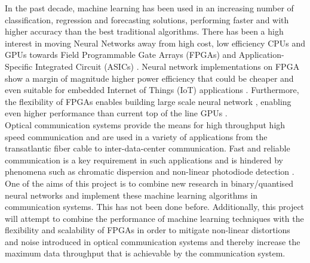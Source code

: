 
\iffalse

Copied and pasted the introduction from our proposal report. I think it's a good start. I've summarised the notes for the intro from the guide below:

- Starting with a general introduction of the area of study and leading to a very narrow insight into the focus of the project
- Aims and Objective of the project in bullet point form
- Briefly introduce the structure of the report

\fi


In the past decade, machine learning has been used in an increasing number of classification, regression and forecasting solutions, performing faster and with higher accuracy than the best traditional algorithms. There has been a high interest in moving Neural Networks away from high cost, low efficiency CPUs and GPUs towards Field Programmable Gate Arrays (FPGAs) and Application-Specific Integrated Circuit (ASICs) \autocite{7929192}. Neural network implementations on FPGA show a margin of magnitude higher power efficiency that could be cheaper and even suitable for embedded Internet of Things (IoT) applications \autocite{7799795,8954866,8469659,8330546,8693488}. Furthermore, the flexibility of FPGAs enables building large scale neural network \autocite{8823487,7045812}, enabling even higher performance than current top of the line GPUs \autocite{8702332,8412552}. 
\\

Optical communication systems provide the means for high throughput high speed communication and are used in a variety of applications from the transatlantic fiber cable to inter-data-center communication. Fast and reliable communication is a key requirement in such applications and is hindered by phenomena such as chromatic dispersion and non-linear photodiode detection \autocite{8433895}. One of the aims of this project is to combine new research in binary/quantised neural networks and implement these machine learning algorithms in communication systems. This has not been done before. Additionally, this project will attempt to combine the performance of machine learning techniques with the flexibility and scalability of FPGAs in order to mitigate non-linear distortions and noise introduced in optical communication systems and thereby increase the maximum data throughput that is achievable by the communication system. 
\\

